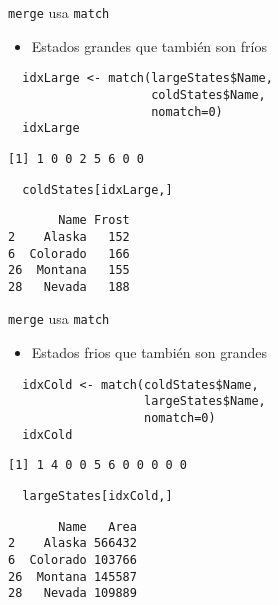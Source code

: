 \documentclass[xcolor={usenames,svgnames,dvipsnames}]{beamer}
\begin{document}
\begin{frame}[fragile,label=sec-5-3]{\texttt{merge} usa \texttt{match}}
 \begin{itemize}
\item Estados grandes que también son fríos
\end{itemize}
\lstset{language=R,label= ,caption= ,numbers=none}
\begin{lstlisting}
  idxLarge <- match(largeStates$Name,
                    coldStates$Name,
                    nomatch=0)
  idxLarge
\end{lstlisting}

\begin{verbatim}
[1] 1 0 0 2 5 6 0 0
\end{verbatim}

\lstset{language=R,label= ,caption= ,numbers=none}
\begin{lstlisting}
  coldStates[idxLarge,]
\end{lstlisting}

\begin{verbatim}
       Name Frost
2    Alaska   152
6  Colorado   166
26  Montana   155
28   Nevada   188
\end{verbatim}
\end{frame}

\begin{frame}[fragile,label=sec-5-4]{\texttt{merge} usa \texttt{match}}
 \begin{itemize}
\item Estados frios que también son grandes
\end{itemize}
\lstset{language=R,label= ,caption= ,numbers=none}
\begin{lstlisting}
  idxCold <- match(coldStates$Name,
                   largeStates$Name,
                   nomatch=0)
  idxCold
\end{lstlisting}

\begin{verbatim}
[1] 1 4 0 0 5 6 0 0 0 0 0
\end{verbatim}

\lstset{language=R,label= ,caption= ,numbers=none}
\begin{lstlisting}
  largeStates[idxCold,]
\end{lstlisting}

\begin{verbatim}
       Name   Area
2    Alaska 566432
6  Colorado 103766
26  Montana 145587
28   Nevada 109889
\end{verbatim}
\end{frame}
\end{document}

